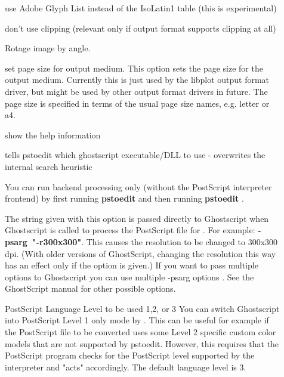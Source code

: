 \documentclass[english,a4paper]{article}
\begin{document}
\begin{description}
\item[] 
use Adobe Glyph List instead of the IsoLatin1 table (this is experimental)


\item[] 
don't use clipping (relevant only if output format supports clipping at all)


\item[] 
Rotage image by angle.


\item[] 
set page size for output medium.  
This option sets the page size for the output medium. Currently this is just used by the libplot output format driver, but might be used by other  output format drivers in future. The page size is specified in terms of the usual page size names, e.g. letter or a4. 


\item[] 
show the help information


\item[] 
tells pstoedit which ghostscript executable/DLL to use - overwrites the internal search heuristic


\item[] 
You can run backend processing only (without the PostScript interpreter frontend) by first running \textbf{pstoedit}    and then running \textbf{pstoedit}     . 


\item[] 
The string given with this option is passed directly to Ghostscript when Ghostscript is called to process the PostScript file for . For example:      \textbf{-psarg}\textbf{~"}\textbf{-r300x300}\textbf{"}. This causes the resolution to be changed to 300x300 dpi. (With older versions of GhostScript, changing the resolution this way has an effect only if the  option is given.)  If you want to pass multiple options to Ghostscript you can use multiple  -psarg options   . See the GhostScript manual for other possible options. 


\item[] 
PostScript Language Level to be used 1,2, or 3 You can switch Ghostscript into PostScript Level 1 only mode by  . This can be useful for example if the PostScript file to be converted uses some Level 2 specific custom color models that are not supported by pstoedit. However, this requires that the PostScript program checks for the PostScript level supported by the interpreter and "acts" accordingly. The default language level is 3.



\end{description}
\end{document}
